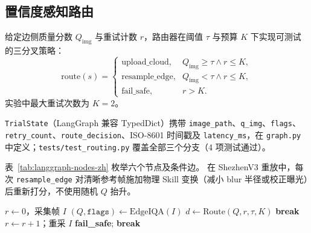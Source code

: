 \subsection{置信度感知路由}
\label{sec:routing-zh}

给定边侧质量分数 $Q_{\mathrm{img}}$ 与重试计数 $r$，路由器在阈值 $\tau$ 与预算 $K$ 下实现可测试的三分叉策略：
\begin{equation}
\text{route}(s)=
\begin{cases}
\text{upload\_cloud}, & Q_{\mathrm{img}}\geq\tau \land r\leq K,\\
\text{resample\_edge}, & Q_{\mathrm{img}}<\tau \land r\leq K,\\
\text{fail\_safe}, & r>K.
\end{cases}
\label{eq:routing-zh}
\end{equation}
实验中最大重试次数为 $K=2$。

\texttt{TrialState}（LangGraph 兼容 TypedDict）携带 \texttt{image\_path}、\texttt{q\_img}、\texttt{flags}、\texttt{retry\_count}、\texttt{route\_decision}、ISO-8601 时间戳及 \texttt{latency\_ms}，在 \texttt{graph.py} 中定义；\texttt{tests/test\_routing.py} 覆盖全部三个分支（4 项测试通过）。

表~\ref{tab:langgraph-nodes-zh} 枚举六个节点及条件边。
在 ShezhenV3 重放中，每次 \texttt{resample\_edge} 对清晰参考帧施加物理 Skill 变换（减小 blur 半径或校正曝光）后重新打分，不使用随机 $Q$ 抬升。

\begin{table}[t]
\centering
\caption{LangGraph 节点与条件边。}
\label{tab:langgraph-nodes-zh}
\small
{}
\end{table}

\begin{algorithm}[t]
\caption{置信度感知路由循环（B2）}
\begin{algorithmic}[1]
\STATE $r \leftarrow 0$，采集帧 $I$
\REPEAT
  \STATE $(Q,\texttt{flags}) \leftarrow \text{EdgeIQA}(I)$
  \STATE $d \leftarrow \text{Route}(Q,r,\tau,K)$ 
    \STATE \textbf{break}
    \STATE $r \leftarrow r+1$；重采 $I$ 
  \ELSE
    \STATE \textbf{fail\_safe}; \textbf{break}
  \ENDIF
{}
\end{algorithmic}
\label{alg:routing-loop-zh}
\end{algorithm}

